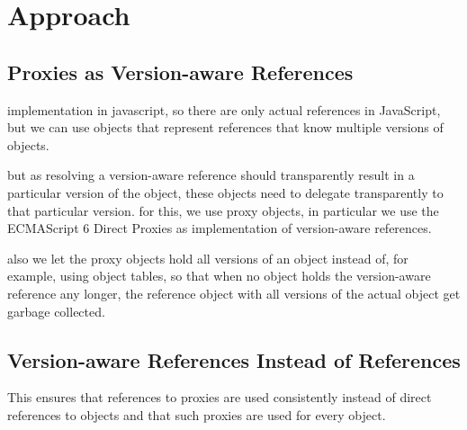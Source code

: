 % 
% 

\section{Approach}

\subsection{Proxies as Version-aware References}

implementation in javascript, so there are only actual references in JavaScript, but we can use objects that represent references that know multiple versions of objects.

but as resolving a version-aware reference should transparently result in a particular version of the object, these objects need to delegate transparently to that particular version.
for this, we use proxy objects, in particular we use the ECMAScript 6 Direct Proxies as implementation of version-aware references.

also we let the proxy objects hold all versions of an object instead of, for example, using object tables, so that when no object holds the version-aware reference any longer, the reference object with all versions of the actual object get garbage collected.



\subsection{Version-aware References Instead of References}

This ensures that references to proxies are used consistently instead of direct references to objects and that such proxies are used for every object.


